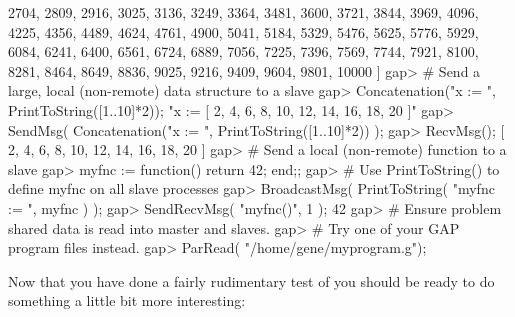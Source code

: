   2704, 2809, 2916, 3025, 3136, 3249, 3364, 3481, 3600, 3721, 3844, 
  3969, 4096, 4225, 4356, 4489, 4624, 4761, 4900, 5041, 5184, 5329, 
  5476, 5625, 5776, 5929, 6084, 6241, 6400, 6561, 6724, 6889, 7056, 
  7225, 7396, 7569, 7744, 7921, 8100, 8281, 8464, 8649, 8836, 9025, 
  9216, 9409, 9604, 9801, 10000 ]
gap> # Send a large, local (non-remote) data structure to a slave
gap> Concatenation("x := ", PrintToString([1..10]*2));
"x := [ 2, 4, 6, 8, 10, 12, 14, 16, 18, 20 ]\n{}"
gap> SendMsg( Concatenation("x := ", PrintToString([1..10]*2)) ); 
gap> RecvMsg();
[ 2, 4, 6, 8, 10, 12, 14, 16, 18, 20 ]
gap> # Send a local (non-remote) function to a slave
gap> myfnc := function() return 42; end;;
gap> # Use PrintToString() to define myfnc on all slave processes
gap> BroadcastMsg( PrintToString( "myfnc := ", myfnc ) );
gap> SendRecvMsg( "myfnc()", 1 );
42
gap> # Ensure problem shared data is read into master and slaves.
gap> # Try one of your GAP program files instead.
gap> ParRead( "/home/gene/myprogram.g");
\endexample

Now that you have done a fairly rudimentary test of {\ParGAP} you  should
be ready to do something a little bit more interesting:

